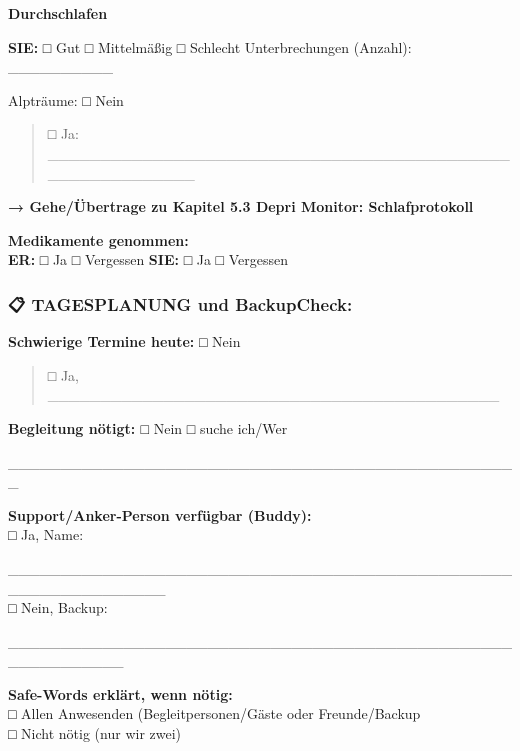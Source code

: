 \textbf{Durchschlafen}

\textbf{SIE:} □ Gut □ Mittelmäßig □ Schlecht Unterbrechungen (Anzahl): \_\_\_\_\_\_\_\_\_\_

Alpträume: □ Nein

\begin{quote}
□ Ja: \_\_\_\_\_\_\_\_\_\_\_\_\_\_\_\_\_\_\_\_\_\_\_\_\_\_\_\_\_\_\_\_\_\_\_\_\_\_\_\_\_\_\_\_\_\_\_\_\_\_\_\_\_\_\_\_\_\_
\end{quote}

\textbf{→ Gehe/Übertrage zu Kapitel 5.3 Depri Monitor: Schlafprotokoll}

\textbf{Medikamente genommen:}\\
\textbf{ER:} □ Ja □ Vergessen \textbf{SIE:} □ Ja □ Vergessen

\hypertarget{section-1}{%
\subsubsection{}\label{section-1}}

\hypertarget{tagesplanung-und-backupcheck}{%
\subsubsection{\texorpdfstring{\textbf{📋 TAGESPLANUNG und BackupCheck:}}{📋 TAGESPLANUNG und BackupCheck:}}\label{tagesplanung-und-backupcheck}}

\textbf{Schwierige Termine heute:} □ Nein

\begin{quote}
\textbf{□} Ja, \_\_\_\_\_\_\_\_\_\_\_\_\_\_\_\_\_\_\_\_\_\_\_\_\_\_\_\_\_\_\_\_\_\_\_\_\_\_\_\_\_\_\_
\end{quote}

\textbf{Begleitung nötigt: □} Nein \textbf{□} suche ich/Wer

\_\_\_\_\_\_\_\_\_\_\_\_\_\_\_\_\_\_\_\_\_\_\_\_\_\_\_\_\_\_\_\_\_\_\_\_\_\_\_\_\_\_\_\_\_\_\_\_\_

\textbf{Support/Anker-Person verfügbar (Buddy):}\\
□ Ja, Name:

\_\_\_\_\_\_\_\_\_\_\_\_\_\_\_\_\_\_\_\_\_\_\_\_\_\_\_\_\_\_\_\_\_\_\_\_\_\_\_\_\_\_\_\_\_\_\_\_\_\_\_\_\_\_\_\_\_\_\_\_\_\_\_\\
□ Nein, Backup:

\_\_\_\_\_\_\_\_\_\_\_\_\_\_\_\_\_\_\_\_\_\_\_\_\_\_\_\_\_\_\_\_\_\_\_\_\_\_\_\_\_\_\_\_\_\_\_\_\_\_\_\_\_\_\_\_\_\_\_

\textbf{Safe-Words erklärt, wenn nötig:}\\
□ Allen Anwesenden (Begleitpersonen/Gäste oder Freunde/Backup\\
□ Nicht nötig (nur wir zwei)

